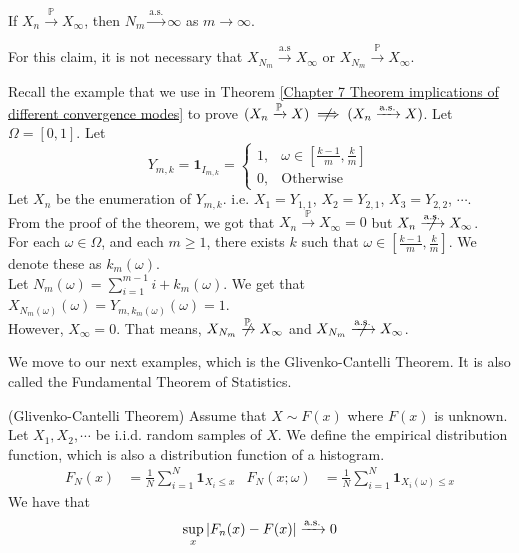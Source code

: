 \documentclass{huhtakm-template-book}
\newcommand{\prob}{\mathbb{P}}
\begin{document}
\begin{cla}
    If $X_{n}\xrightarrow{\prob}X_{\infty}$, then $N_{m}\xrightarrow{\text{a.s.}}\infty$ as $m\to\infty$.
\end{cla}
\begin{rem}
    For this claim, it is not necessary that $X_{N_{m}}\xrightarrow{\text{a.s}}X_{\infty}$ or $X_{N_{m}}\xrightarrow{\prob}X_{\infty}$.
\end{rem}
\begin{eg}
    Recall the example that we use in Theorem \ref{Chapter 7 Theorem implications of different convergence modes} to prove $(X_{n}\xrightarrow{\prob}X)\centernot\implies(X_{n}\xrightarrow{\text{a.s.}}X)$. Let $\Omega=[0,1]$. Let
    \begin{equation*}
        Y_{m,k}=\mathbf{1}_{I_{m,k}}=\begin{cases}
            1, &\omega\in\left[\frac{k-1}{m},\frac{k}{m}\right]\\
            0, &\text{Otherwise}
        \end{cases}
    \end{equation*}
    Let $X_{n}$ be the enumeration of $Y_{m,k}$. i.e. $X_{1}=Y_{1,1}$, $X_{2}=Y_{2,1}$, $X_{3}=Y_{2,2}$, $\cdots$.\\
    From the proof of the theorem, we got that $X_{n}\xrightarrow{\prob}X_{\infty}=0$ but $X_{n}\centernot{\xrightarrow{\text{a.s.}}}X_{\infty}$.\\
    For each $\omega\in\Omega$, and each $m\geq 1$, there exists $k$ such that $\omega\in\left[\frac{k-1}{m},\frac{k}{m}\right]$. We denote these as $k_{m}(\omega)$.\\
    Let $N_{m}(\omega)=\sum_{i=1}^{m-1}i+k_{m}(\omega)$. We get that $X_{N_{m}(\omega)}(\omega)=Y_{m,k_{m}(\omega)}(\omega)=1$.\\
    However, $X_{\infty}=0$. That means, $X_{N_{m}}\centernot{\xrightarrow{\prob}}X_{\infty}$ and $X_{N_{m}}\centernot{\xrightarrow{\text{a.s.}}}X_{\infty}$.
\end{eg}
We move to our next examples, which is the Glivenko-Cantelli Theorem. It is also called the Fundamental Theorem of Statistics.
\begin{thm}(Glivenko-Cantelli Theorem)
    Assume that $X\sim F(x)$ where $F(x)$ is unknown. Let $X_{1},X_{2},\cdots$ be i.i.d. random samples of $X$. We define the empirical distribution function, which is also a distribution function of a histogram.
    \begin{align*}
        F_{N}(x)&=\frac{1}{N}\sum_{i=1}^{N}\mathbf{1}_{X_{i}\leq x} & F_{N}(x;\omega)&=\frac{1}{N}\sum_{i=1}^{N}\mathbf{1}_{X_{i}(\omega)\leq x}
    \end{align*}
    We have that
    \begin{equation*}
        \sup_{x}\left|{F_{n}(x)-F(x)}\right|\xrightarrow{\text{a.s.}}0
    \end{equation*}
\end{thm}
\end{document}

